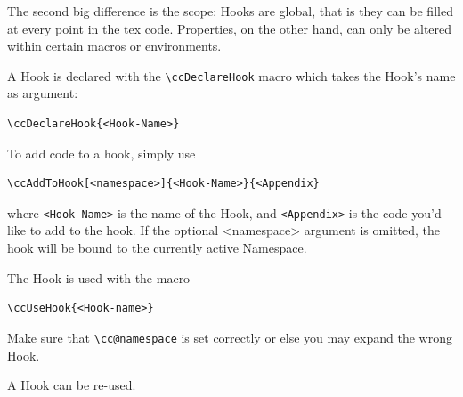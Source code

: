 The second big difference is the scope: Hooks are global, that is they
can be filled at every point in the tex code. Properties, on the other
hand, can only be altered within certain macros or environments.

A Hook is declared with the \lstinline{\ccDeclareHook} macro which
takes the Hook's name as argument:
\begin{lstlisting}
\ccDeclareHook{<Hook-Name>}
\end{lstlisting}

To add code to a hook, simply use
\begin{lstlisting}[style=tex]
\ccAddToHook[<namespace>]{<Hook-Name>}{<Appendix}
\end{lstlisting}
where \lstinline{<Hook-Name>} is the name of the Hook, and
\lstinline{<Appendix>} is the code you'd like to add to the hook. If
the optional <namespace> argument is omitted, the hook will be bound
to the currently active Namespace.

The Hook is used with the macro
\begin{lstlisting}[style=tex]
\ccUseHook{<Hook-name>}
\end{lstlisting}
Make sure that \lstinline{\cc@namespace} is set correctly or else you
may expand the wrong Hook.

A Hook can be re-used.
